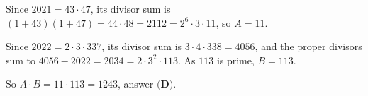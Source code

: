 Since $2021=43\cdot47$, its divisor sum is $(1+43)(1+47)=44\cdot48=2112=2^6\cdot3\cdot11$, so $A=11$.

Since $2022=2\cdot3\cdot337$, its divisor sum is $3\cdot4\cdot338=4056$, and the proper divisors sum to $4056-2022=2034=2\cdot3^2\cdot113$. As $113$ is prime, $B=113$.

So $A\cdot B=11\cdot113=\boxed{1243}$, answer $\textbf{(D)}$.
